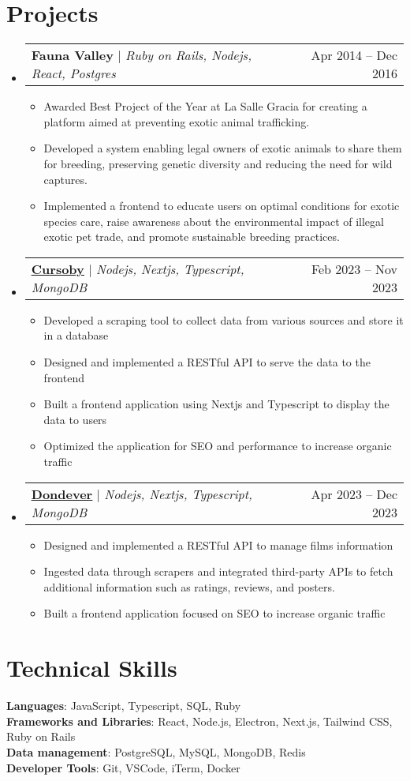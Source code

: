 \documentclass[letterpaper,11pt]{article}
\makeatletter
\newcommand{\resumeItem}[1]{
  \item\small{
    {#1 \vspace{-2pt}}
  }
}
\newcommand{\resumeProjectHeading}[2]{
    \item
    \begin{tabular*}{0.97\textwidth}{l@{\extracolsep{\fill}}r}
      \small#1 & #2 \\
    \end{tabular*}\vspace{-7pt}
}
\newcommand{\resumeSubHeadingListStart}{\begin{itemize}[leftmargin=0.15in, label={}]}
\newcommand{\resumeSubHeadingListEnd}{\end{itemize}}
\newcommand{\resumeItemListStart}{\begin{itemize}}
\newcommand{\resumeItemListEnd}{\end{itemize}\vspace{-5pt}}
\makeatother
\begin{document}
\section{Projects}
    \resumeSubHeadingListStart
      \resumeProjectHeading
          {\textbf{Fauna Valley}  $|$ \emph{Ruby on Rails, Nodejs, React, Postgres}}{Apr 2014 -- Dec 2016}
          \resumeItemListStart
            \resumeItem{Awarded Best Project of the Year at La Salle Gracia for creating a platform aimed at preventing exotic animal trafficking.}
            \resumeItem{Developed a system enabling legal owners of exotic animals to share them for breeding, preserving genetic diversity and reducing the need for wild captures.}
            \resumeItem{Implemented a frontend to educate users on optimal conditions for exotic species care, raise awareness about the environmental impact of illegal exotic pet trade, and promote sustainable breeding practices.}
          \resumeItemListEnd
      \resumeProjectHeading
          {\textbf{\href{https://cursoby.com}{\underline{Cursoby}}}  $|$ \emph{Nodejs, Nextjs, Typescript, MongoDB}}{Feb 2023 -- Nov 2023}
          \resumeItemListStart
            \resumeItem{Developed a scraping tool to collect data from various sources and store it in a database}
            \resumeItem{Designed and implemented a RESTful API to serve the data to the frontend}
            \resumeItem{Built a frontend application using Nextjs and Typescript to display the data to users}
            \resumeItem{Optimized the application for SEO and performance to increase organic traffic}
          \resumeItemListEnd
      \resumeProjectHeading
          {\textbf{\href{https://dondever.com}{\underline{Dondever}}}  $|$ \emph{Nodejs, Nextjs, Typescript, MongoDB}}{Apr 2023 -- Dec 2023}
          \resumeItemListStart
            \resumeItem{Designed and implemented a RESTful API to manage films information}
            \resumeItem{Ingested data through scrapers and integrated third-party APIs to fetch additional information such as ratings, reviews, and posters.}
            \resumeItem{Built a frontend application focused on SEO to increase organic traffic}
          \resumeItemListEnd

    \resumeSubHeadingListEnd

\section{Technical Skills}
 \begin{itemize}[leftmargin=0.15in, label={}]
    \small{\item{
     \textbf{Languages}{: JavaScript, Typescript, SQL, Ruby} \\
     \textbf{Frameworks and Libraries}{: React, Node.js, Electron, Next.js, Tailwind CSS, Ruby on Rails} \\
     \textbf{Data management}{: PostgreSQL, MySQL, MongoDB, Redis} \\
     \textbf{Developer Tools}{: Git, VSCode, iTerm, Docker} \\
    }}
 \end{itemize}

\end{document}

